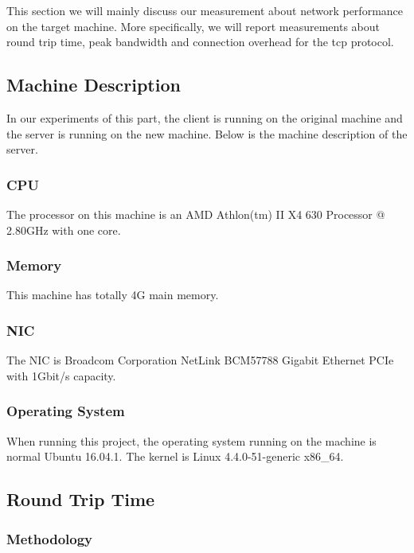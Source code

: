 
% 

This section we will mainly discuss our measurement about network performance on the target machine. More specifically, we will report measurements about round trip time, peak bandwidth and connection overhead for the tcp protocol.

\subsection{Machine Description}
\label{Network_machine_desc}
In our experiments of this part, the client is running on the original machine and the server is running on the new machine. Below is the machine description of the server.

\subsubsection{CPU}

The processor on this machine is an AMD Athlon(tm) II X4 630 Processor @ 2.80GHz with one core.

\subsubsection{Memory}

This machine has totally 4G main memory.

\subsubsection{NIC}

The NIC is Broadcom Corporation NetLink BCM57788 Gigabit Ethernet PCIe with 1Gbit/s capacity.

\subsubsection{Operating System}
When running this project, the operating system running on the machine is normal Ubuntu 16.04.1. The kernel is Linux 4.4.0-51-generic x86\_64.

\subsection{Round Trip Time}

\subsubsection{Methodology}

